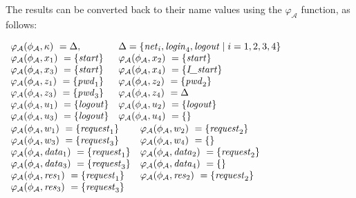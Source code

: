 \documentclass[10pt,a4paper,final,oneside,fleqn]{book}
\begin{document}
\noindent
The results can be converted back to their name values using the $\varphi_\mathcal{A}$ function, as follows:\vspace{4mm}

\noindent
$\begin{array}{ll}
\varphi_\mathcal{A}(\phi_\mathcal{A},\kappa)~=\Delta,&\multicolumn{1}{l}{\Delta=\{\mbox{{\itshape net\/}}_i, \mbox{{\itshape login\/}}_4, \mbox{{\itshape logout\/}}\mid i=1,2,3,4\}}\\
\varphi_\mathcal{A}(\phi_\mathcal{A},x_1)~=\{\mbox{{\itshape start\/}}\}& \varphi_\mathcal{A}(\phi_\mathcal{A},x_2)~=\{\mbox{{\itshape start\/}}\}\\
\varphi_\mathcal{A}(\phi_\mathcal{A},x_3)~=\{\mbox{{\itshape start\/}}\}&\varphi_\mathcal{A}(\phi_\mathcal{A},x_4)~=\{\mbox{{\itshape I\_start\/}}\}\\
\varphi_\mathcal{A}(\phi_\mathcal{A},z_1)~=\{\mbox{{\itshape pwd\/}}_1\}&\varphi_\mathcal{A}(\phi_\mathcal{A},z_2)~=\{\mbox{{\itshape pwd\/}}_2\}\\
\varphi_\mathcal{A}(\phi_\mathcal{A},z_3)~=\{\mbox{{\itshape pwd\/}}_3\}&\varphi_\mathcal{A}(\phi_\mathcal{A},z_4)~=\Delta\\
\varphi_\mathcal{A}(\phi_\mathcal{A},u_1)~=\{\mbox{{\itshape logout\/}}\}&\varphi_\mathcal{A}(\phi_\mathcal{A},u_2)~=\{\mbox{{\itshape logout\/}}\}\\

\varphi_\mathcal{A}(\phi_\mathcal{A},u_3)~=\{\mbox{{\itshape logout\/}}\}&\varphi_\mathcal{A}(\phi_\mathcal{A},u_4)~=\{\}\\
\end{array}$\\
$\begin{array}{ll}
\varphi_\mathcal{A}(\phi_\mathcal{A},w_1)~=\{\mbox{{\itshape request\/}}_1\}&\varphi_\mathcal{A}(\phi_\mathcal{A},w_2)~=\{\mbox{{\itshape request\/}}_2\}\\
\varphi_\mathcal{A}(\phi_\mathcal{A},w_3)~=\{\mbox{{\itshape request\/}}_3\}&\varphi_\mathcal{A}(\phi_\mathcal{A},w_4)~=\{\}\\
\varphi_\mathcal{A}(\phi_\mathcal{A},\mbox{{\itshape data\/}}_1)~=\{\mbox{{\itshape request\/}}_1\}&\varphi_\mathcal{A}(\phi_\mathcal{A},\mbox{{\itshape data\/}}_2)~=\{\mbox{{\itshape request\/}}_2\}\\
\varphi_\mathcal{A}(\phi_\mathcal{A},\mbox{{\itshape data\/}}_3)~=\{\mbox{{\itshape request\/}}_3\}&\varphi_\mathcal{A}(\phi_\mathcal{A},\mbox{{\itshape data\/}}_4)~=\{\}\\
\varphi_\mathcal{A}(\phi_\mathcal{A},\mbox{{\itshape res\/}}_1)~=\{\mbox{{\itshape request\/}}_1\}&\varphi_\mathcal{A}(\phi_\mathcal{A},\mbox{{\itshape res\/}}_2)~=\{\mbox{{\itshape request\/}}_2\}\\

\varphi_\mathcal{A}(\phi_\mathcal{A},\mbox{{\itshape res\/}}_3)~=\{\mbox{{\itshape request\/}}_3\}
\end{array}$\vspace{5mm}
\end{document}
